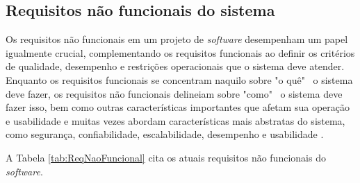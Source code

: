 \subsection{Requisitos não funcionais do sistema}

Os requisitos não funcionais em um projeto de \textit{software} desempenham um papel igualmente crucial, complementando os requisitos funcionais ao definir os critérios de qualidade, desempenho e restrições operacionais que o sistema deve atender. Enquanto os requisitos funcionais se concentram naquilo sobre "o quê" \ o sistema deve fazer, os requisitos não funcionais delineiam sobre "como" \ o sistema deve fazer isso, bem como outras características importantes que afetam sua operação e usabilidade e muitas vezes abordam características mais abstratas do sistema, como segurança, confiabilidade, escalabilidade, desempenho e usabilidade \cite{softwareengreq}. 
            
A Tabela \ref{tab:ReqNaoFuncional} cita os atuais requisitos não funcionais do \textit{software}.

